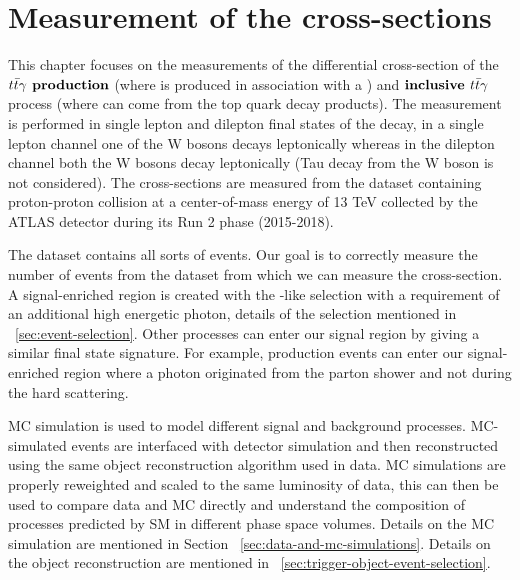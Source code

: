 
\chapter{Measurement of the \tty cross-sections} %
\label{Chapter3} %
This chapter focuses on the measurements of the differential cross-section of the $\textbf{\tty production}$ (where \ttbar is produced in association with a \photon) and $\textbf{inclusive $t\bar{t}\gamma$}$ process (where \photon can come from the top quark decay products). The measurement is performed in single lepton and dilepton final states of the \ttbar decay, in a single lepton channel one of the W bosons decays leptonically whereas in the dilepton channel both the W bosons decay leptonically (Tau decay from the W boson is not considered). The cross-sections are measured from the dataset containing proton-proton collision at a center-of-mass energy of 13 TeV collected by the ATLAS detector during its Run 2 phase (2015-2018). 

The dataset contains all sorts of events. Our goal is to correctly measure the number of \tty events from the dataset from which we can measure the cross-section. A signal-enriched region is created with the \ttbar-like selection with a requirement of an additional high energetic photon, details of the selection mentioned in ~\cref{sec:event-selection}.  Other processes can enter our signal region by giving a similar final state signature. For example, \ttbar production events can enter our signal-enriched region where a photon originated from the parton shower and not during the hard scattering. 

MC simulation is used to model different signal and background processes. MC-simulated events are interfaced with detector simulation and then reconstructed using the same object reconstruction algorithm used in data. MC simulations are properly reweighted and scaled to the same luminosity of data, this can then be used to compare data and MC directly and understand the composition of processes predicted by SM in different phase space volumes. Details on the MC simulation are mentioned in Section ~\cref{sec:data-and-mc-simulations}. Details on the object reconstruction are mentioned in ~\cref{sec:trigger-object-event-selection}.

